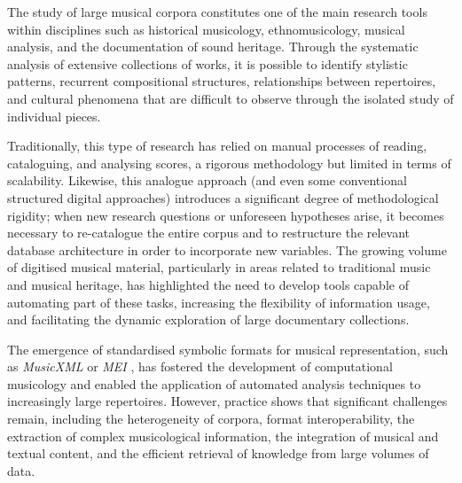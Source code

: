 
The study of large musical corpora constitutes one of the main research tools within disciplines such as historical musicology, ethnomusicology, musical analysis, and the documentation of sound heritage. Through the systematic analysis of extensive collections of works, it is possible to identify stylistic patterns, recurrent compositional structures, relationships between repertoires, and cultural phenomena that are difficult to observe through the isolated study of individual pieces.

Traditionally, this type of research has relied on manual processes of reading, cataloguing, and analysing scores, a rigorous methodology but limited in terms of scalability. Likewise, this analogue approach (and even some conventional structured digital approaches) introduces a significant degree of methodological rigidity; when new research questions or unforeseen hypotheses arise, it becomes necessary to re-catalogue the entire corpus and to restructure the relevant database architecture in order to incorporate new variables. The growing volume of digitised musical material, particularly in areas related to traditional music and musical heritage, has highlighted the need to develop tools capable of automating part of these tasks, increasing the flexibility of information usage, and facilitating the dynamic exploration of large documentary collections.

The emergence of standardised symbolic formats for musical representation, such as \textit{MusicXML} \citep{good2001musicxml} or \textit{MEI} \citep{roland2002music}, has fostered the development of computational musicology and enabled the application of automated analysis techniques to increasingly large repertoires. However, practice shows that significant challenges remain, including the heterogeneity of corpora, format interoperability, the extraction of complex musicological information, the integration of musical and textual content, and the efficient retrieval of knowledge from large volumes of data.

